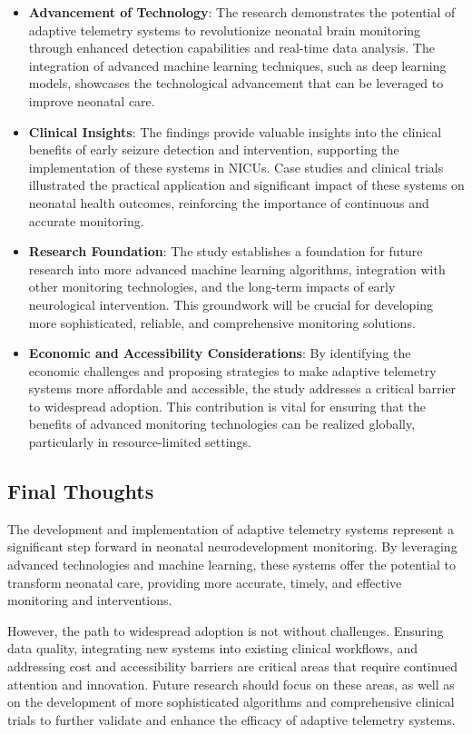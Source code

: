 \documentclass[12pt,journal,compsoc]{IEEEtran}
\begin{document}
\begin{itemize}
    \item \textbf{Advancement of Technology}: The research demonstrates the potential of adaptive telemetry systems to revolutionize neonatal brain monitoring through enhanced detection capabilities and real-time data analysis. The integration of advanced machine learning techniques, such as deep learning models, showcases the technological advancement that can be leveraged to improve neonatal care.
    \item \textbf{Clinical Insights}: The findings provide valuable insights into the clinical benefits of early seizure detection and intervention, supporting the implementation of these systems in NICUs. Case studies and clinical trials illustrated the practical application and significant impact of these systems on neonatal health outcomes, reinforcing the importance of continuous and accurate monitoring.
    \item \textbf{Research Foundation}: The study establishes a foundation for future research into more advanced machine learning algorithms, integration with other monitoring technologies, and the long-term impacts of early neurological intervention. This groundwork will be crucial for developing more sophisticated, reliable, and comprehensive monitoring solutions.
    \item \textbf{Economic and Accessibility Considerations}: By identifying the economic challenges and proposing strategies to make adaptive telemetry systems more affordable and accessible, the study addresses a critical barrier to widespread adoption. This contribution is vital for ensuring that the benefits of advanced monitoring technologies can be realized globally, particularly in resource-limited settings.
\end{itemize}

\subsection{Final Thoughts}

The development and implementation of adaptive telemetry systems represent a significant step forward in neonatal neurodevelopment monitoring. By leveraging advanced technologies and machine learning, these systems offer the potential to transform neonatal care, providing more accurate, timely, and effective monitoring and interventions.

However, the path to widespread adoption is not without challenges. Ensuring data quality, integrating new systems into existing clinical workflows, and addressing cost and accessibility barriers are critical areas that require continued attention and innovation. Future research should focus on these areas, as well as on the development of more sophisticated algorithms and comprehensive clinical trials to further validate and enhance the efficacy of adaptive telemetry systems.
\end{document}
